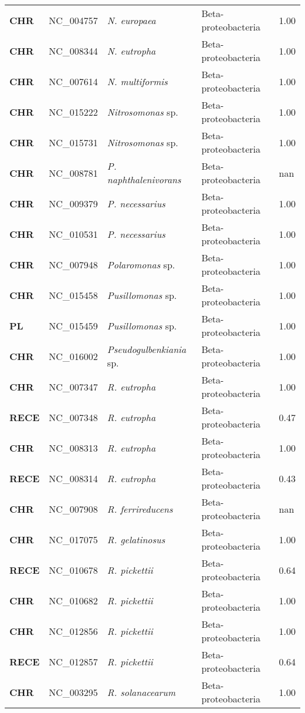 \begin{adjustwidth}{-3cm}{2cm}
{\begin{supertabular}{>{\bfseries}l|p{0.1\textwidth}p{0.14\textwidth}l|l}
CHR & NC\_004757 & \textit{N. europaea} & Beta-proteobacteria & 1.00\\
CHR & NC\_008344 & \textit{N. eutropha} & Beta-proteobacteria & 1.00\\
CHR & NC\_007614 & \textit{N. multiformis} & Beta-proteobacteria & 1.00\\
CHR & NC\_015222 & \textit{Nitrosomonas} sp. & Beta-proteobacteria & 1.00\\
CHR & NC\_015731 & \textit{Nitrosomonas} sp. & Beta-proteobacteria & 1.00\\
CHR & NC\_008781 & \textit{P. naphthalenivorans} & Beta-proteobacteria & nan\\
CHR & NC\_009379 & \textit{P. necessarius} & Beta-proteobacteria & 1.00\\
CHR & NC\_010531 & \textit{P. necessarius} & Beta-proteobacteria & 1.00\\
CHR & NC\_007948 & \textit{Polaromonas} sp. & Beta-proteobacteria & 1.00\\
CHR & NC\_015458 & \textit{Pusillomonas} sp. & Beta-proteobacteria & 1.00\\
PL & NC\_015459 & \textit{Pusillomonas} sp. & Beta-proteobacteria & 1.00\\
CHR & NC\_016002 & \textit{Pseudogulbenkiania} sp. & Beta-proteobacteria & 1.00\\
CHR & NC\_007347 & \textit{R. eutropha} & Beta-proteobacteria & 1.00\\
RECE & NC\_007348 & \textit{R. eutropha} & Beta-proteobacteria & 0.47\\
CHR & NC\_008313 & \textit{R. eutropha} & Beta-proteobacteria & 1.00\\
RECE & NC\_008314 & \textit{R. eutropha} & Beta-proteobacteria & 0.43\\
CHR & NC\_007908 & \textit{R. ferrireducens} & Beta-proteobacteria & nan\\
CHR & NC\_017075 & \textit{R. gelatinosus} & Beta-proteobacteria & 1.00\\
RECE & NC\_010678 & \textit{R. pickettii} & Beta-proteobacteria & 0.64\\
CHR & NC\_010682 & \textit{R. pickettii} & Beta-proteobacteria & 1.00\\
CHR & NC\_012856 & \textit{R. pickettii} & Beta-proteobacteria & 1.00\\
RECE & NC\_012857 & \textit{R. pickettii} & Beta-proteobacteria & 0.64\\
CHR & NC\_003295 & \textit{R. solanacearum} & Beta-proteobacteria & 1.00\\

\end{supertabular}}
\end{adjustwidth}
